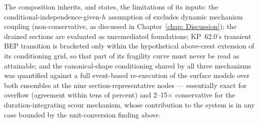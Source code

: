 The composition inherits, and states, the limitations of its inputs: the
conditional-independence-given-$h$ assumption of \textcite{pol_ress_2023}
excludes dynamic mechanism coupling (non-conservative, as discussed in
Chapter~\ref{chap: Discussion}); the drained sections are evaluated as
unremediated foundations; KP~62.0's transient BEP transition is bracketed
only within the hypothetical above-crest extension of its conditioning
grid, so that part of its fragility curve must never be read as
attainable; and the canonical-shape conditioning shared by all three mechanisms
was quantified against a full event-based re-execution of the surface
models over both ensembles at the nine section-representative nodes ---
essentially exact for overflow (agreement within tens of percent) and
2--15$\times$ conservative for the duration-integrating scour mechanism,
whose contribution to the system is in any case bounded by the
unit-conversion finding above.
